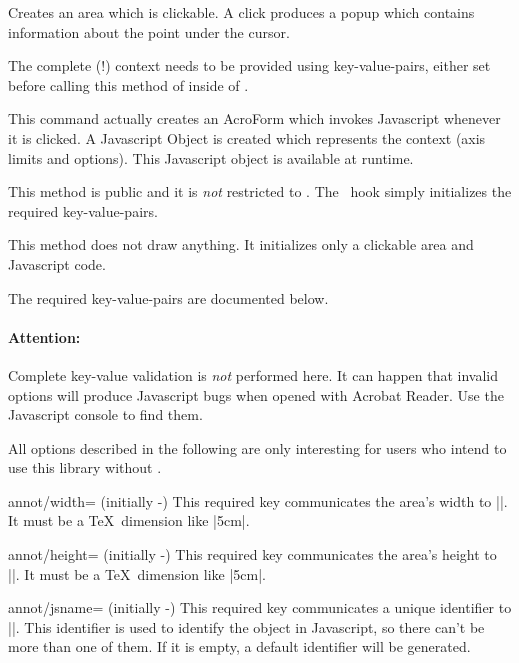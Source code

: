 \begin{command}{\pgfplotsclickablecreate{}}
	Creates an area which is clickable. A click produces a popup which
	contains information about the point under the cursor.
	
	The complete (!) context needs to be provided using key-value-pairs, either set before
	calling this method of inside of .
	
	This command actually creates an AcroForm which invokes Javascript
	whenever it is clicked. A Javascript Object is created which
	represents the context (axis limits and options). This Javascript
	object is available at runtime.
	
	This method is public and it is \emph{not} restricted to \PGFPlots.
	The \PGFPlots\ hook simply initializes the required key-value-pairs.

	This method does not draw anything. It initializes only a
	clickable area and Javascript code.
	
	The required key-value-pairs are documented below.
	
	\paragraph{Attention:} Complete key-value validation is \emph{not} performed here. It
	can happen that invalid options will produce Javascript bugs when
	opened with Acrobat Reader. Use the Javascript console to find them.
\end{command}

\noindent All options described in the following are only interesting for users who intend to use this library without \PGFPlots.

\begin{pgfplotskey}{annot/width= (initially -)}
	This required key communicates the area's width to |\pgfplotsclickablecreate|. It must be a \TeX\ dimension like |5cm|.
\end{pgfplotskey}
\begin{pgfplotskey}{annot/height= (initially -)}
	This required key communicates the area's height to |\pgfplotsclickablecreate|. It must be a \TeX\ dimension like |5cm|.
\end{pgfplotskey}
\begin{pgfplotskey}{annot/jsname= (initially -)}
	This required key communicates a unique identifier to |\pgfplotsclickablecreate|. This identifier is used to identify the object in Javascript, so there can't be more than one of them. If it is empty, a default identifier will be generated.
\end{pgfplotskey}

